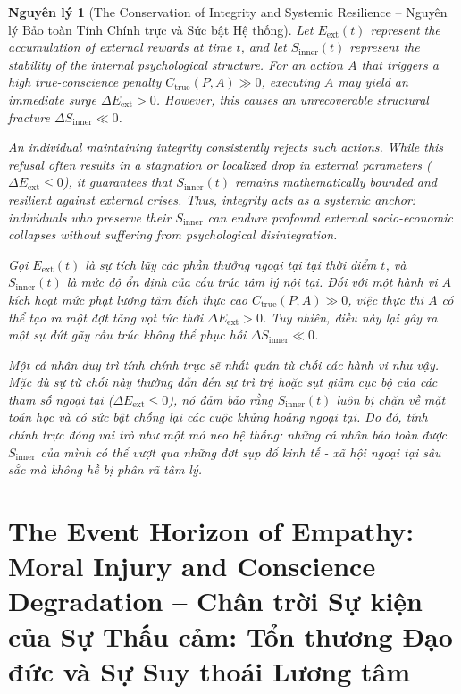 \documentclass{report}
\newtheorem{nguyenly}{Nguyên lý}
\begin{document}
\begin{nguyenly}[The Conservation of Integrity and Systemic Resilience -- Nguyên lý Bảo toàn Tính Chính trực và Sức bật Hệ thống]
	Let $E_{\text{ext}}(t)$ represent the accumulation of external rewards at time $t$, and let $S_{\text{inner}}(t)$ represent the stability of the internal psychological structure. For an action $A$ that triggers a high true-conscience penalty $C_{\text{true}}(P, A) \gg 0$, executing $A$ may yield an immediate surge $\Delta E_{\text{ext}} > 0$. However, this causes an unrecoverable structural fracture $\Delta S_{\text{inner}} \ll 0$.
	
	An individual maintaining integrity consistently rejects such actions. While this refusal often results in a stagnation or localized drop in external parameters ($\Delta E_{\text{ext}} \le 0$), it guarantees that $S_{\text{inner}}(t)$ remains mathematically bounded and resilient against external crises. Thus, integrity acts as a systemic anchor: individuals who preserve their $S_{\text{inner}}$ can endure profound external socio-economic collapses without suffering from psychological disintegration.
	
	Gọi $E_{\text{ext}}(t)$ là sự tích lũy các phần thưởng ngoại tại tại thời điểm $t$, và $S_{\text{inner}}(t)$ là mức độ ổn định của cấu trúc tâm lý nội tại. Đối với một hành vi $A$ kích hoạt mức phạt lương tâm đích thực cao $C_{\text{true}}(P, A) \gg 0$, việc thực thi $A$ có thể tạo ra một đợt tăng vọt tức thời $\Delta E_{\text{ext}} > 0$. Tuy nhiên, điều này lại gây ra một sự đứt gãy cấu trúc không thể phục hồi $\Delta S_{\text{inner}} \ll 0$.
	
	Một cá nhân duy trì tính chính trực sẽ nhất quán từ chối các hành vi như vậy. Mặc dù sự từ chối này thường dẫn đến sự trì trệ hoặc sụt giảm cục bộ của các tham số ngoại tại ($\Delta E_{\text{ext}} \le 0$), nó đảm bảo rằng $S_{\text{inner}}(t)$ luôn bị chặn về mặt toán học và có sức bật chống lại các cuộc khủng hoảng ngoại tại. Do đó, tính chính trực đóng vai trò như một mỏ neo hệ thống: những cá nhân bảo toàn được $S_{\text{inner}}$ của mình có thể vượt qua những đợt sụp đổ kinh tế - xã hội ngoại tại sâu sắc mà không hề bị phân rã tâm lý.
\end{nguyenly}

\section{The Event Horizon of Empathy: Moral Injury and Conscience Degradation -- Chân trời Sự kiện của Sự Thấu cảm: Tổn thương Đạo đức và Sự Suy thoái Lương tâm}
\end{document}
